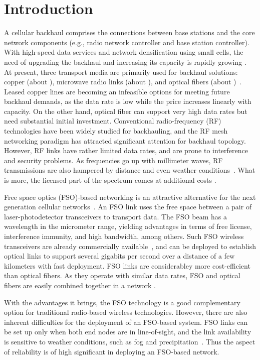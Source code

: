 \documentclass[onecolumn,11pt,draftclsnofoot]{IEEEtran}
\begin{document}
\IEEEpeerreviewmaketitle

\section{Introduction}

A cellular backhaul comprises the connections between base stations and the core network components (e.g., radio network controller and base station controller). With high-speed data services and network densification using small cells, the need of upgrading the backhaul and increasing its capacity is rapidly growing \cite{Ford2013}.
At present, three transport media are primarily used for backhaul solutions: copper (about ), microwave radio links (about ), and optical fibers (about )~\cite{Tipmongkolsilp2011}. Leased copper lines are becoming an infeasible options for meeting future backhaul demands, as the data rate is low while the price increases linearly with capacity. On the other hand, optical fiber can support very high data rates but need substantial initial investment. Conventional radio-frequency (RF) technologies have been widely studied for backhauling, and the RF mesh networking paradigm has attracted significant attention for backhaul topology. However, RF links have rather limited data rates, and are prone to interference and security problems. As frequencies go up with millimeter waves, RF transmissions are also hampered by distance and even weather conditions~\cite{Frey99}. What is more, the licensed part of the spectrum comes at additional costs \cite{Chia2009}.

Free space optics (FSO)-based networking is an attractive alternative for the next generation cellular networks~\cite{Demers2011}. An FSO link uses the free space between a pair of laser-photodetector transceivers to transport data. The FSO beam has a wavelength in the micrometer range, yielding advantages in terms of free license, interference immunity, and high bandwidth, among others. Such FSO wireless transceivers are already commercially available~\cite{Chan06}, and can be deployed to establish optical links to support several gigabits per second over a distance of a few kilometers with fast deployment. FSO links are considerabley more cost-efficient than optical fibers. As they operate with similar data rates, FSO and optical fibers are easily combined together in a network \cite{Refai2006}.

With the advantages it brings, the FSO technology is a good complementary option for traditional radio-based wireless technologies. However, there are also inherent difficulties for the deployment of an FSO-based system. FSO links can be set up only when both end nodes are in line-of-sight, and the link availability is sensitive to weather conditions, such as fog and precipitation~\cite{Ghassemlooy2012}. Thus the aspect of reliability is of high significant in deploying an FSO-based network.
\end{document}
